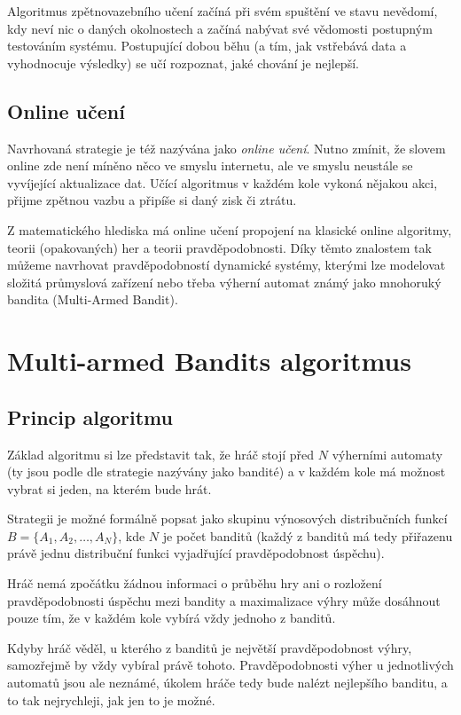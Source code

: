 \documentclass[thesis=M,czech]{FITthesis}[2014/05/07]
\begin{document}
Algoritmus zpětnovazebního učení začíná při svém spuštění ve stavu nevědomí, kdy neví nic o daných okolnostech a začíná nabývat své vědomosti postupným testováním systému. Postupující dobou běhu (a tím, jak vstřebává data a vyhodnocuje výsledky) se učí rozpoznat, jaké chování je nejlepší.

\subsection{Online učení}
\label{sub:online}

Navrhovaná strategie je též nazývána jako \emph{online učení}. Nutno zmínit, že slovem online zde není míněno něco ve smyslu internetu, ale ve smyslu neustále se vyvíjející aktualizace dat. Učící algoritmus v každém kole vykoná nějakou akci, přijme zpětnou vazbu a připíše si daný zisk či ztrátu.

Z matematického hlediska má online učení propojení na klasické online algoritmy, teorii (opakovaných) her a teorii pravděpodobnosti. Díky těmto znalostem tak můžeme navrhovat pravděpodobností dynamické systémy, kterými lze modelovat složitá průmyslová zařízení nebo třeba výherní automat známý jako mnohoruký bandita (Multi-Armed Bandit).

\section{Multi-armed Bandits algoritmus}
\label{sec:multi}

\subsection{Princip algoritmu}
Základ algoritmu si lze představit tak, že hráč stojí před $N$ výherními automaty (ty jsou podle dle strategie nazývány jako bandité) a v každém kole má možnost vybrat si jeden, na kterém bude hrát.

Strategii je možné formálně popsat jako skupinu výnosových distribučních funkcí $B = \{ A_1, A_2, \ldots, A_N \}$, kde $N$ je počet banditů (každý z banditů má tedy přiřazenu právě jednu distribuční funkci vyjadřující pravděpodobnost úspěchu). 

Hráč nemá zpočátku žádnou informaci o průběhu hry ani o rozložení pravděpodobnosti úspěchu mezi bandity a maximalizace výhry může dosáhnout pouze tím, že v každém kole vybírá vždy jednoho z banditů.

Kdyby hráč věděl, u kterého z banditů je největší pravděpodobnost výhry, samozřejmě by vždy vybíral právě tohoto. Pravděpodobnosti výher u jednotlivých automatů jsou ale neznámé, úkolem hráče tedy bude nalézt nejlepšího banditu, a to tak nejrychleji, jak jen to je možné.
\end{document}
